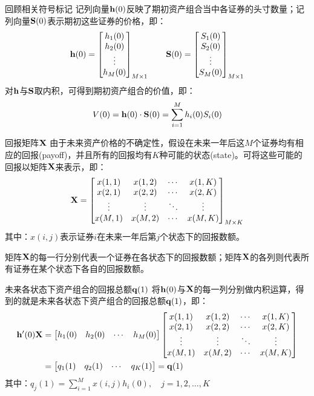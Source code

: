 \documentclass[t]{beamer}
\begin{document}
\begin{frame}{回顾相关符号标记}
记列向量${\bf h}(0)$反映了期初资产组合当中各证券的头寸数量；记列向量${\bf S}(0)$表示期初这些证券的价格，即：
\[ {\bf h}(0)=\begin{bmatrix}
h_1(0)\\
h_2(0)\\
\vdots\\
h_M(0)\\
\end{bmatrix}_{M\times 1}\qquad {\bf S}(0)=\begin{bmatrix}
S_1(0)\\
S_2(0)\\
\vdots\\
S_M(0)\\
\end{bmatrix}_{M\times 1}   \]
对${\bf h}$与${\bf S}$取内积，可得到期初资产组合的价值，即：
\[V(0)={\bf h}(0)\cdot {\bf S}(0)=\sum^M_{i=1}h_i(0) S_i(0) \]
\end{frame}

\begin{frame}{回报矩阵${\bf X}$}
由于未来资产价格的不确定性，假设在未来一年后这$M$个证券均有相应的回报(payoff)，并且所有的回报均有$K$种可能的状态(state)。可将这些可能的回报以矩阵${\bf X}$来表示，即：
\[{\bf X}=\begin{bmatrix}
x(1,1) & x(1,2)& \cdots & x(1,K)\\
x(2,1) & x(2,2)& \cdots & x(2,K)\\
\vdots & \vdots&\ddots&\vdots\\
x(M,1) & x(M,2)& \cdots & x(M,K)\\
\end{bmatrix}_{M\times K} \]
其中：$x(i,j)$表示证券$i$在未来一年后第$j$个状态下的回报数额。

矩阵${\bf X}$的每一行分别代表一个证券在各状态下的回报数额；矩阵${\bf X}$的各列则代表所有证券在某个状态下各自的回报数额。
\end{frame}

\begin{frame}{未来各状态下资产组合的回报总额${\bf q}(1)$}
将${\bf h}(0)$与${\bf X}$的每一列分别做内积运算，得到的就是未来各状态下资产组合的回报总额${\bf q}(1)$，即：
\[\begin{split}
	{\bf h}'(0){\bf X}&=\begin{bmatrix}
	h_1(0)&
	h_2(0)&
	\cdots&
	h_M(0)
	\end{bmatrix}\begin{bmatrix}
	x(1,1) & x(1,2)& \cdots & x(1,K)\\
	x(2,1) & x(2,2)& \cdots & x(2,K)\\
	\vdots & \vdots&\ddots&\vdots\\
	x(M,1) & x(M,2)& \cdots & x(M,K)\\
	\end{bmatrix}\\
	&=\begin{bmatrix}
	q_1(1)&
	q_2(1)&
	\cdots&
	q_K(1)
	\end{bmatrix}={\bf q}(1) 
	\end{split} \]
其中：$q_j(1)=\sum^M_{i=1}x(i,j)h_i(0) ,\quad j=1,2,\ldots,K $
\end{frame}
\end{document}
